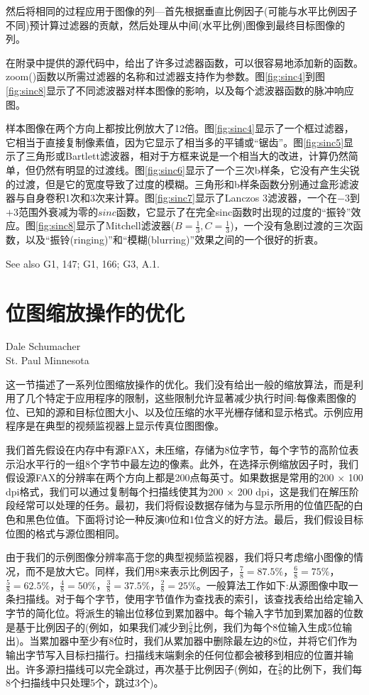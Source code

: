 \begin{CJK}{UTF8}{gbsn}
然后将相同的过程应用于图像的列—首先根据垂直比例因子(可能与水平比例因子不同)预计算过滤器的贡献，然后处理从中间(水平比例)图像到最终目标图像的列。

在附录中提供的源代码中，给出了许多过滤器函数，可以很容易地添加新的函数。zoom()函数以所需过滤器的名称和过滤器支持作为参数。图\ref{fig:sinc4}到图\ref{fig:sinc8}显示了不同滤波器对样本图像的影响，以及每个滤波器函数的脉冲响应图。

样本图像在两个方向上都按比例放大了12倍。图\ref{fig:sinc4}显示了一个框过滤器，它相当于直接复制像素值，因为它显示了相当多的平铺或“锯齿”。图\ref{fig:sinc5}显示了三角形或Bartlett滤波器，相对于方框来说是一个相当大的改进，计算仍然简单，但仍然有明显的过渡线。图\ref{fig:sinc6}显示了一个三次b样条，它没有产生尖锐的过渡，但是它的宽度导致了过度的模糊。三角形和b样条函数分别通过盒形滤波器与自身卷积1次和3次来计算。图\ref{fig:sinc7}显示了Lanczos 3滤波器，一个在$-3$到$+3$范围外衰减为零的$sinc$函数，它显示了在完全sinc函数时出现的过度的“振铃”效应。图\ref{fig:sinc8}显示了Mitchell滤波器($B = \frac{1}{3}, C =\frac{1}{3} $)，一个没有急剧过渡的三次函数，以及“振铃(ringing)”和“模糊(blurring)”效果之间的一个很好的折衷。

See also G1, 147; G1, 166; G3, A.1.

\newpage
\section{位图缩放操作的优化}
\begin{center}
\small{
Dale Schumacher\\
St. Paul Minnesota}
\end{center}

这一节描述了一系列位图缩放操作的优化。我们没有给出一般的缩放算法，而是利用了几个特定于应用程序的限制，这些限制允许显著减少执行时间:每像素图像的位、已知的源和目标位图大小、以及位压缩的水平光栅存储和显示格式。示例应用程序是在典型的视频监视器上显示传真位图图像。

我们首先假设在内存中有源FAX，未压缩，存储为8位字节，每个字节的高阶位表示沿水平行的一组8个字节中最左边的像素。此外，在选择示例缩放因子时，我们假设源FAX的分辨率在两个方向上都是200点每英寸。如果数据是常用的200 × 100 dpi格式，我们可以通过复制每个扫描线使其为200 × 200 dpi，这是我们在解压阶段经常可以处理的任务。最初，我们将假设数据存储为与显示所用的位值匹配的白色和黑色位值。下面将讨论一种反演0位和1位含义的好方法。最后，我们假设目标位图的格式与源位图相同。

由于我们的示例图像分辨率高于您的典型视频监视器，我们将只考虑缩小图像的情况，而不是放大它。同样，我们用8来表示比例因子，$ \frac{7}{8}=87.5\%$，$ \frac{6}{8}=75\%$，$\frac{5}{8}=62.5\%$，$ \frac{4}{8}=50\%$，$ \frac{3}{8}=37.5\%$，$\frac{2}{8}=25\% $。一般算法工作如下:从源图像中取一条扫描线。对于每个字节，使用字节值作为查找表的索引，该查找表给出给定输入字节的简化位。将派生的输出位移位到累加器中。每个输入字节加到累加器的位数是基于比例因子的(例如，如果我们减少到$ \frac{5}{8} $比例，我们为每个8位输入生成5位输出)。当累加器中至少有8位时，我们从累加器中删除最左边的8位，并将它们作为输出字节写入目标扫描行。扫描线末端剩余的任何位都会被移到相应的位置并输出。许多源扫描线可以完全跳过，再次基于比例因子(例如，在$ \frac{5}{8} $的比例下，我们每8个扫描线中只处理5个，跳过3个)。


\end{CJK}
